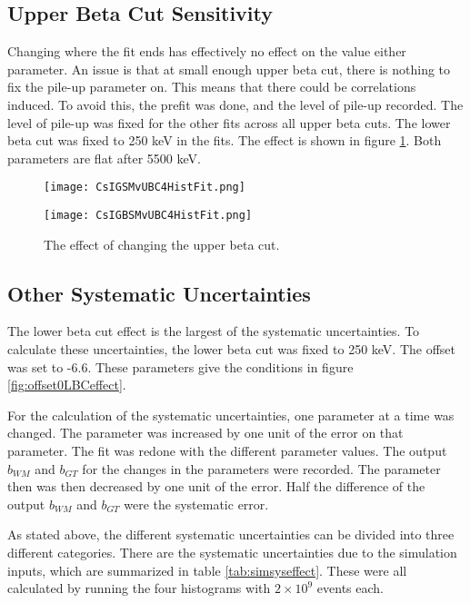 \documentclass[../MaxHughesThesis.tex]{subfiles}
\begin{document}
\subsection{Upper Beta Cut Sensitivity}

Changing where the fit ends has effectively no effect on the value either parameter.
An issue is that at small enough upper beta cut, there is nothing to fix the pile-up parameter on. 
This means that there could be correlations induced.
To avoid this, the  prefit was done, and the level of pile-up recorded.
The level of pile-up was fixed for the other fits across all upper beta cuts.
The lower beta cut was fixed to 250 keV in the fits. 
The effect is shown in figure \ref{fig:UBCEffect}.
Both parameters are flat after 5500 keV.

\begin{figure}
    \centering
    \begin{minipage}{0.50\textwidth}
        \centerline{\texttt{[image: CsIGSMvUBC4HistFit.png]}}
    \end{minipage}\hfill
    \begin{minipage}{0.50\textwidth}
        \centerline{\texttt{[image: CsIGBSMvUBC4HistFit.png]}}
    \end{minipage}
    \caption{The effect of changing the upper beta cut.}
    \label{fig:UBCEffect}
\end{figure}

\subsection{Other Systematic Uncertainties}

The lower beta cut effect is the largest of the systematic uncertainties.
To calculate these uncertainties, the lower beta cut was fixed to 250 keV.
The offset was set to -6.6.
These parameters give the conditions in figure \ref{fig:offset0LBCeffect}.

For the calculation of the systematic uncertainties, one parameter at a time was changed.
The parameter was increased by one unit of the error on that parameter.
The fit was redone with the different parameter values.
The output $b_{WM}$ and $b_{GT}$ for the changes in the parameters were recorded.
The parameter then was then decreased by one unit of the error.
Half the difference of the output $b_{WM}$ and $b_{GT}$ were the systematic error.

As stated above, the different systematic uncertainties can be divided into three different categories. 
There are the systematic uncertainties due to the simulation inputs, which are summarized in table \ref{tab:simsyseffect}.
These were all calculated by running the four histograms with $2 \times 10^{9}$ events each.
\end{document}
